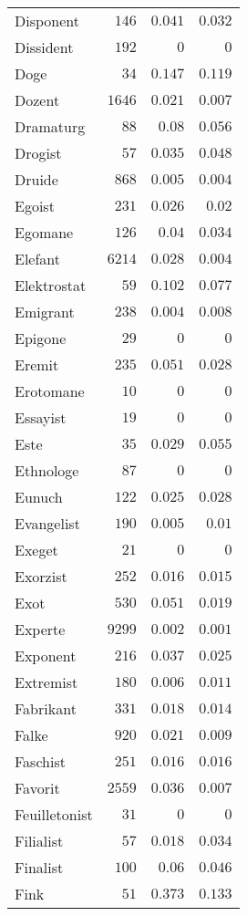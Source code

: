 \begin{supertabular}{lrrr}
Disponent & $146$ & $0.041$ & $0.032$ \\
Dissident & $192$ & $0$ & $0$ \\
Doge & $34$ & $0.147$ & $0.119$ \\
Dozent & $1646$ & $0.021$ & $0.007$ \\
Dramaturg & $88$ & $0.08$ & $0.056$ \\
Drogist & $57$ & $0.035$ & $0.048$ \\
Druide & $868$ & $0.005$ & $0.004$ \\
Egoist & $231$ & $0.026$ & $0.02$ \\
Egomane & $126$ & $0.04$ & $0.034$ \\
Elefant & $6214$ & $0.028$ & $0.004$ \\
Elektrostat & $59$ & $0.102$ & $0.077$ \\
Emigrant & $238$ & $0.004$ & $0.008$ \\
Epigone & $29$ & $0$ & $0$ \\
Eremit & $235$ & $0.051$ & $0.028$ \\
Erotomane & $10$ & $0$ & $0$ \\
Essayist & $19$ & $0$ & $0$ \\
Este & $35$ & $0.029$ & $0.055$ \\
Ethnologe & $87$ & $0$ & $0$ \\
Eunuch & $122$ & $0.025$ & $0.028$ \\
Evangelist & $190$ & $0.005$ & $0.01$ \\
Exeget & $21$ & $0$ & $0$ \\
Exorzist & $252$ & $0.016$ & $0.015$ \\
Exot & $530$ & $0.051$ & $0.019$ \\
Experte & $9299$ & $0.002$ & $0.001$ \\
Exponent & $216$ & $0.037$ & $0.025$ \\
Extremist & $180$ & $0.006$ & $0.011$ \\
Fabrikant & $331$ & $0.018$ & $0.014$ \\
Falke & $920$ & $0.021$ & $0.009$ \\
Faschist & $251$ & $0.016$ & $0.016$ \\
Favorit & $2559$ & $0.036$ & $0.007$ \\
Feuilletonist & $31$ & $0$ & $0$ \\
Filialist & $57$ & $0.018$ & $0.034$ \\
Finalist & $100$ & $0.06$ & $0.046$ \\
Fink & $51$ & $0.373$ & $0.133$ \\

\end{supertabular}
